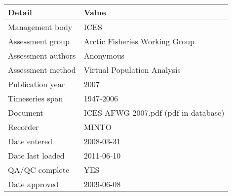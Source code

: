 \begin{table}[htb]
\centering
\begin{tabular}{lp{7cm}}
\toprule
Detail & Value \\
\midrule
Management body    & ICES                                 \\
Assessment group   & Arctic Fisheries Working Group       \\
Assessment authors & Anonymous                            \\
Assessment method  & Virtual Population Analysis          \\
Publication year   & 2007                                 \\
Timeseries span    & 1947-2006                            \\
Document           & ICES-AFWG-2007.pdf (pdf in database) \\
Recorder           & MINTO                                \\
Date entered       & 2008-03-31                           \\
Date last loaded   & 2011-06-10                           \\
QA/QC complete     & YES                                  \\
Date approved      & 2009-06-08                           \\
\bottomrule
\end{tabular}
\label{tab:assessdet}
\end{table}
